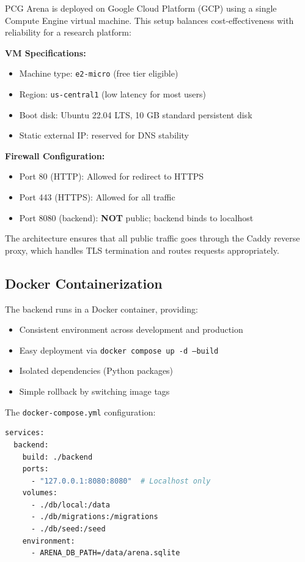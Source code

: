 \documentclass[11pt,a4paper]{article}
\theoremstyle{plain}
\theoremstyle{definition}
\theoremstyle{remark}
\begin{document}
PCG Arena is deployed on Google Cloud Platform (GCP) using a single Compute Engine virtual machine. This setup balances cost-effectiveness with reliability for a research platform:

\textbf{VM Specifications:}
\begin{itemize}
    \item Machine type: \texttt{e2-micro} (free tier eligible)
    \item Region: \texttt{us-central1} (low latency for most users)
    \item Boot disk: Ubuntu 22.04 LTS, 10 GB standard persistent disk
    \item Static external IP: reserved for DNS stability
\end{itemize}

\textbf{Firewall Configuration:}
\begin{itemize}
    \item Port 80 (HTTP): Allowed for redirect to HTTPS
    \item Port 443 (HTTPS): Allowed for all traffic
    \item Port 8080 (backend): \textbf{NOT} public; backend binds to localhost
\end{itemize}

The architecture ensures that all public traffic goes through the Caddy reverse proxy, which handles TLS termination and routes requests appropriately.

\subsection{Docker Containerization}
\label{subsec:docker}

The backend runs in a Docker container, providing:

\begin{itemize}
    \item Consistent environment across development and production
    \item Easy deployment via \texttt{docker compose up -d --build}
    \item Isolated dependencies (Python packages)
    \item Simple rollback by switching image tags
\end{itemize}

The \texttt{docker-compose.yml} configuration:

\begin{lstlisting}[language=bash]
services:
  backend:
    build: ./backend
    ports:
      - "127.0.0.1:8080:8080"  # Localhost only
    volumes:
      - ./db/local:/data
      - ./db/migrations:/migrations
      - ./db/seed:/seed
    environment:
      - ARENA_DB_PATH=/data/arena.sqlite
\end{lstlisting}
\end{document}
